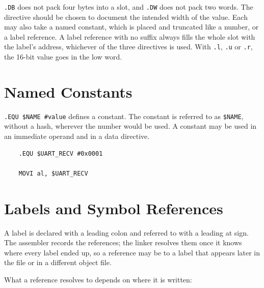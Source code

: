 \texttt{.DB} does not pack four bytes into a slot, and \texttt{.DW} does not pack two words. The directive should be chosen
to document the intended width of the value. Each may also take a named constant, which is placed and truncated like a
number, or a label reference. A label reference with no suffix always fills the whole slot with the label's address,
whichever of the three directives is used. With \texttt{.l}, \texttt{.u} or \texttt{.r}, the 16-bit value goes in the
low word.

\section{Named Constants}

\texttt{.EQU \$NAME \#value} defines a constant. The constant is referred to as \texttt{\$NAME}, without a hash, wherever the number would be
used. A constant may be used in an immediate operand and in a data directive.

\begin{lstlisting}
    .EQU $UART_RECV #0x0001

    MOVI al, $UART_RECV
\end{lstlisting}

\section{Labels and Symbol References}

A label is declared with a leading colon and referred to with a leading at sign. The assembler records the references;
the linker resolves them once it knows where every label ended up, so a reference may be to a label that appears later
in the file or in a different object file.

What a reference resolves to depends on where it is written:

